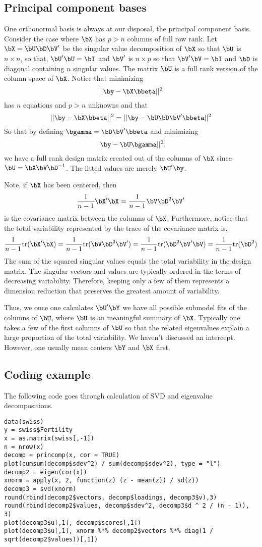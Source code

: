 \subsection{Principal component bases}


One orthonormal basis is always at our disposal, the principal component basis. 
Consider the case where $\bX$ has $p > n$ columns of full row rank.
Let $\bX = \bU \bD \bV'$ be the singular value decomposition of $\bX$ so
that $\bU$ is $n \times n$, so that, $\bU' \bU = \bI$ and $\bV'$
is $n\times p$ so that $\bV' \bV = \bI$ and $\bD$ is diagonal containing
$n$ singular values. The matrix $\bU$ is a full rank version of the
column space of $\bX$. Notice that minimizing
$$
||\by - \bX \bbeta||^2
$$
has $n$ equations and $p>n$ unknowns and that
$$
||\by - \bX \bbeta||^2
= 
||\by -  \bU \bD \bV' \bbeta||^2
$$
So that by defining $\bgamma = \bD \bV' \bbeta$ and minimizing 
$$
||\by -  \bU \bgamma||^2.
$$
we have a full rank design matrix created out of the columns of $\bX$ since
$\bU = \bX \bV \bD^{-1}$. 
The fitted values are merely $\bU' \by$.

Note, if $\bX$ has been centered, then 
$$
\frac{1}{n-1} \bX' \bX = \frac{1}{n-1} \bV \bD^2 \bV'
$$
is the covariance matrix between the columns of $\bX$. Furthermore,
notice that the total variability represented by the trace of the covariance
matrix is, 
$$\frac{1}{n-1} \mbox{tr}(\bX' \bX)
= \frac{1}{n-1} \mbox{tr}(\bV \bD^2 \bV')
=\frac{1}{n-1} \mbox{tr}(\bD^2 \bV' \bV)
= \frac{1}{n-1} \mbox{tr}(\bD^2)
$$
The sum of the squared singular values equals the total variability in the
design matrix. 
The singular
vectors and values are typically ordered in the terms of decreasing
variability. Therefore, keeping only a few of them represents a dimension
reduction that preserves the greatest amount of variability.

Thus, we once one calculates $\bU' \bY$ we have all possible submodel
fits of the columns of $\bU$, where $\bU$ is an meaningful summary
of $\bX$. Typically one takes a few of the first columns of $\bU$
so that the related eigenvalues explain a large proportion of the
total variability. We haven't discussed an intercept. However, 
one usually mean centers $\bY$ and $\bX$ first.


\subsection{Coding example}

The following code goes through calculation of SVD and eigenvalue 
decompositions.

\begin{verbatim}
data(swiss)
y = swiss$Fertility
x = as.matrix(swiss[,-1])
n = nrow(x)
decomp = princomp(x, cor = TRUE)
plot(cumsum(decomp$sdev^2) / sum(decomp$sdev^2), type = "l")
decomp2 = eigen(cor(x))
xnorm = apply(x, 2, function(z) (z - mean(z)) / sd(z))
decomp3 = svd(xnorm)
round(rbind(decomp2$vectors, decomp$loadings, decomp3$v),3)
round(rbind(decomp2$values, decomp$sdev^2, decomp3$d ^ 2 / (n - 1)), 3)
plot(decomp3$u[,1], decomp$scores[,1])
plot(decomp3$u[,1], xnorm %*% decomp2$vectors %*% diag(1 / sqrt(decomp2$values))[,1])
\end{verbatim}

